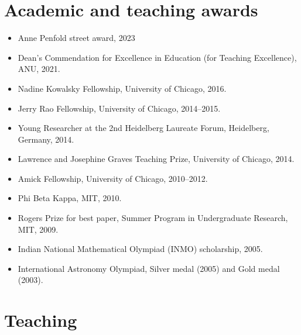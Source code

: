 \documentclass[a4paper]{moderncv}
\begin{document}
\section*{Academic and teaching awards}
\label{sec:org118b097}
\begin{itemize}
\item Anne Penfold street award, 2023
\item Dean's Commendation for Excellence in Education (for Teaching Excellence), ANU, 2021.
\item Nadine Kowalsky Fellowship, University of Chicago, 2016.
\item Jerry Rao Fellowship, University of Chicago, 2014--2015.
\item Young Researcher at the 2nd Heidelberg Laureate Forum, Heidelberg, Germany, 2014.
\item Lawrence and Josephine Graves Teaching Prize, University of Chicago, 2014.
\item Amick Fellowship, University of Chicago, 2010--2012.
\item Phi Beta Kappa, MIT, 2010.
\item Rogers Prize for best paper, Summer Program in Undergraduate Research, MIT, 2009.
\item Indian National Mathematical Olympiad (INMO) scholarship, 2005.
\item International Astronomy Olympiad, Silver medal (2005) and Gold medal (2003).
\end{itemize}

\section*{Teaching}
\label{sec:org0df3b64}
\end{document}

